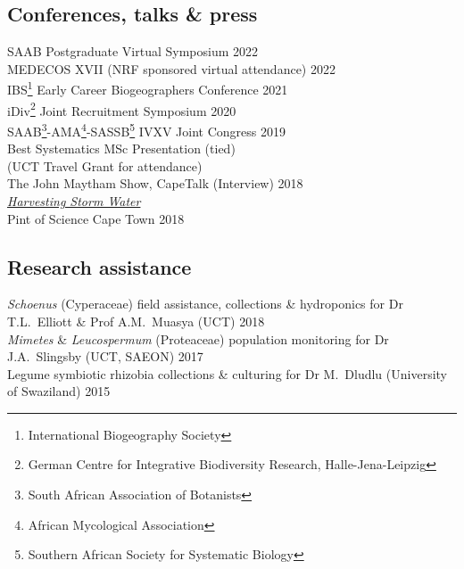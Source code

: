 \documentclass[10pt]{article}
\begin{document}
\begin{multicols}{2}
\subsection*{Conferences, talks \& press} %

SAAB Postgraduate Virtual Symposium                      \hfill {\small 2022} \\
MEDECOS XVII {\small (NRF sponsored virtual attendance)} \hfill {\small 2022} \\
IBS\footnote{International Biogeography Society}
  Early Career Biogeographers Conference                 \hfill {\small 2021} \\
iDiv\footnote{
    German Centre for Integrative Biodiversity Research, Halle-Jena-Leipzig}
  Joint Recruitment Symposium                            \hfill {\small 2020} \\
SAAB\footnote{
    South African Association of Botanists}-AMA\footnote{
      African Mycological Association}-SASSB\footnote{
        Southern African Society for Systematic Biology}
  IVXV Joint Congress                                    \hfill {\small 2019} \\
  \hspace{2em} {\small Best Systematics MSc Presentation (tied)}              \\
  \hspace{2em} {\small (UCT Travel Grant for attendance)}                     \\
The John Maytham Show, CapeTalk     {\small (Interview)} \hfill {\small 2018} \\
  \hspace{2em} {\small \href{https://www.capetalk.co.za/articles/328900/harvesting-stormwater-from-liesbeek-river-may-aid-ct-water-supply-students-find}
                            {\textit{Harvesting Storm Water}}}                \\
Pint of Science Cape Town                                \hfill {\small 2018}

\end{multicols} %

\subsection*{Research assistance} %

\textit{Schoenus} (Cyperaceae)
  field assistance, collections \& hydroponics
  for Dr T.L.~Elliott \& Prof A.M.~Muasya
  {\small (UCT)}                                         \hfill {\small 2018} \\
\textit{Mimetes} \& \textit{Leucospermum} (Proteaceae)
  population monitoring
  for Dr J.A.~Slingsby
  {\small (UCT, SAEON)}                                  \hfill {\small 2017} \\
Legume symbiotic rhizobia
  collections \& culturing
  for Dr M.~Dludlu
  {\small (University of Swaziland)}                     \hfill {\small 2015}
\end{document}
